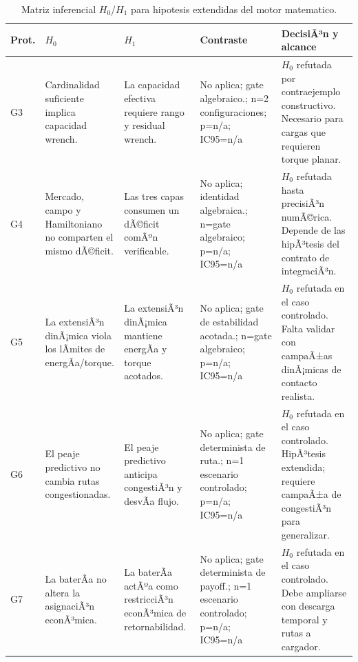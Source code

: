 \begin{table}[H]
\centering
\caption{Matriz inferencial $H_0$/$H_1$ para hipotesis extendidas del motor matematico.}
\label{tab:hypothesis-decision-extended}
\scriptsize
\begin{tabularx}{\textwidth}{@{}>{\raggedright\arraybackslash}p{}>{\raggedright\arraybackslash}p{}>{\raggedright\arraybackslash}p{}>{\raggedright\arraybackslash}p{}>{\raggedright\arraybackslash}X@{}}
\toprule
Prot. & $H_0$ & $H_1$ & Contraste & DecisiÃ³n y alcance \\
\midrule
G3 & Cardinalidad suficiente implica capacidad wrench. & La capacidad efectiva requiere rango y residual wrench. & No aplica; gate algebraico.; n=2 configuraciones; p=n/a; IC95=n/a & $H_0$ refutada por contraejemplo constructivo. Necesario para cargas que requieren torque planar. \\
G4 & Mercado, campo y Hamiltoniano no comparten el mismo dÃ©ficit. & Las tres capas consumen un dÃ©ficit comÃºn verificable. & No aplica; identidad algebraica.; n=gate algebraico; p=n/a; IC95=n/a & $H_0$ refutada hasta precisiÃ³n numÃ©rica. Depende de las hipÃ³tesis del contrato de integraciÃ³n. \\
G5 & La extensiÃ³n dinÃ¡mica viola los lÃ­mites de energÃ­a/torque. & La extensiÃ³n dinÃ¡mica mantiene energÃ­a y torque acotados. & No aplica; gate de estabilidad acotada.; n=gate algebraico; p=n/a; IC95=n/a & $H_0$ refutada en el caso controlado. Falta validar con campaÃ±as dinÃ¡micas de contacto realista. \\
G6 & El peaje predictivo no cambia rutas congestionadas. & El peaje predictivo anticipa congestiÃ³n y desvÃ­a flujo. & No aplica; gate determinista de ruta.; n=1 escenario controlado; p=n/a; IC95=n/a & $H_0$ refutada en el caso controlado. HipÃ³tesis extendida; requiere campaÃ±a de congestiÃ³n para generalizar. \\
G7 & La baterÃ­a no altera la asignaciÃ³n econÃ³mica. & La baterÃ­a actÃºa como restricciÃ³n econÃ³mica de retornabilidad. & No aplica; gate determinista de payoff.; n=1 escenario controlado; p=n/a; IC95=n/a & $H_0$ refutada en el caso controlado. Debe ampliarse con descarga temporal y rutas a cargador. \\
\bottomrule
\end{tabularx}
\end{table}

